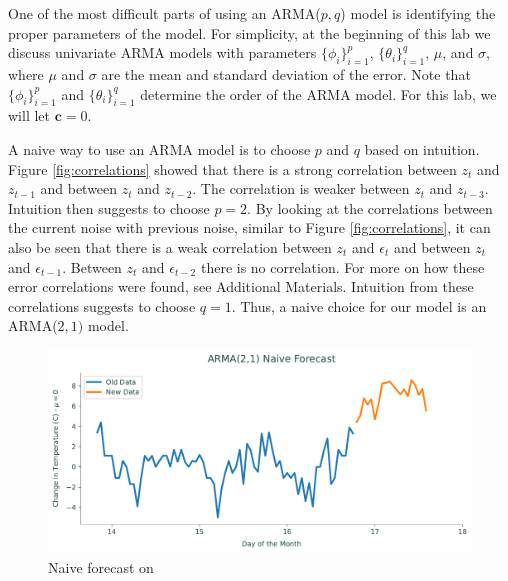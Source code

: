 One of the most difficult parts of using an ARMA($p,q$) model is identifying the proper parameters of the model.
For simplicity, at the beginning of this lab we discuss univariate ARMA models with parameters $\{\phi_i\}_{i=1}^p$, $\{\theta_i\}_{i=1}^q$, $\mu$, and $\sigma$, where $\mu$ and $\sigma$ are the mean and standard deviation of the error.
Note that $\{\phi_i\}_{i=1}^p$ and $\{\theta_i\}_{i=1}^q$ determine the order of the ARMA model.
For this lab, we will let $\mathbf{c}=0$.

A naive way to use an ARMA model is to choose $p$ and $q$ based on intuition.
Figure \ref{fig:correlations} showed that there is a strong correlation between $z_t$ and $z_{t-1}$ and between $z_t$ and $z_{t-2}$.
The correlation is weaker between $z_t$ and $z_{t-3}$.
Intuition then suggests to choose $p=2$.
By looking at the correlations between the current noise with previous noise, similar to Figure \ref{fig:correlations}, it can also be seen that there is a weak correlation between $z_t$ and $\epsilon_t$ and between $z_t$ and $\epsilon_{t-1}$.
Between $z_t$ and $\epsilon_{t-2}$ there is no correlation.
For more on how these error correlations were found, see Additional Materials.
Intuition from these correlations suggests to choose $q=1$.
Thus, a naive choice for our model is an ARMA($2,1)$ model.

\begin{figure}[H]
\centering
\includegraphics[width=\textwidth]{figures/naive.pdf}
\caption{Naive forecast on }
\label{fig:ARMA:naive}
\end{figure}

